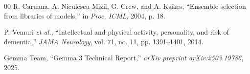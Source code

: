 \documentclass[conference]{IEEEtran}
\begin{document}
\begin{thebibliography}{00}
 R. Caruana, A. Niculescu-Mizil, G. Crew, and A. Ksikes, ``Ensemble selection from libraries of models,'' in \textit{Proc. ICML}, 2004, p. 18.

 P. Vemuri \textit{et al.}, ``Intellectual and physical activity, personality, and risk of dementia,'' \textit{JAMA Neurology}, vol. 71, no. 11, pp. 1391--1401, 2014.

 Gemma Team, ``Gemma 3 Technical Report,'' \textit{arXiv preprint arXiv:2503.19786}, 2025.

\end{thebibliography}
\end{document}
